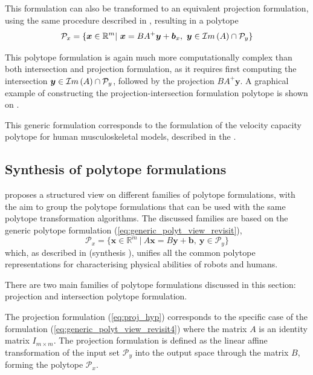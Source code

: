 This formulation can also be transformed to an equivalent projection formulation, using the same procedure described in , resulting in a polytope 
\begin{equation}
\mathcal{P}_x=\{\bm{x} \in \mathbb{R}^m |~ \bm{x} = BA^+\bm{y} + \bm{b}_x,~ \bm{y}\in \mathcal{I}m\left(A\right)\cap\mathcal{P}_y\} 
\end{equation}

This polytope formulation is again much more computationally complex than both intersection and projection formulation, as it requires first computing the intersection $\bm{y} \in \mathcal{I}m\left(A\right)\cap\mathcal{P}_y$, followed by the projection $BA^{+}\bm{y}$. A graphical example of constructing the projection-intersection formulation polytope is shown on .

\begin{remark}
    This generic formulation corresponds to the formulation of the velocity capacity polytope for human musculoskeletal models, described in the .
\end{remark}


\subsection{Synthesis of polytope formulations}
\label{ch:which_metric_which_formulation}

 proposes a structured view on different families of polytope formulations, with the aim to group the polytope formulations that can be used with the same polytope transformation algorithms. The discussed families are based on the generic polytope formulation (\ref{eq:generic_polyt_view_revisit}), 
\begin{equation}
    \mathcal{P}_x = \{\bm{x}\in\mathbb{R}^m ~|~ A\bm{x}=B\bm{y} + \bm{b}, ~ \bm{y}\in\mathcal{P}_y\}
    \label{eq:generic_polyt_view_revisit4}
\end{equation}
which, as described in  (synthesis ), unifies all the common polytope representations for characterising physical abilities of robots and humans. 

There are two main families of polytope formulations discussed in this section: projection and intersection polytope formulation. 

The projection formulation (\ref{eq:proj_hyp}) corresponds to the specific case of the formulation  (\ref{eq:generic_polyt_view_revisit4}) where the matrix $A$ is an identity matrix $I_{m\times m}$.
The projection formulation is defined as the linear affine transformation of the input set $\mathcal{P}_y$ into the output space through the matrix $B$, forming the polytope $\mathcal{P}_x$. 

